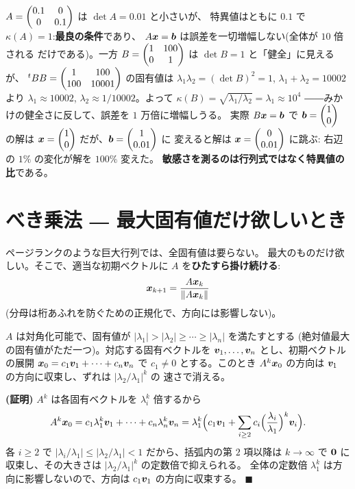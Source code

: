 \begin{hanrei}[行列式は敏感さの指標にならない]\label{hanrei:num-det}
$A = \begin{pmatrix}0.1 & 0 \\ 0 & 0.1\end{pmatrix}$ は $\det A = 0.01$ と小さいが、
特異値はともに $0.1$ で $\kappa(A) = 1$:\textbf{最良の条件}であり、
$A\bm{x} = \bm{b}$ は誤差を一切増幅しない(全体が $10$ 倍される
だけである)。一方
$B = \begin{pmatrix}1 & 100 \\ 0 & 1\end{pmatrix}$ は $\det B = 1$ と「健全」に見えるが、
${}^tBB = \begin{pmatrix}1 & 100 \\ 100 & 10001\end{pmatrix}$ の固有値は
$\lambda_1\lambda_2 = (\det B)^2 = 1$, $\lambda_1 + \lambda_2 = 10002$
より $\lambda_1 \approx 10002$, $\lambda_2 \approx 1/10002$。よって
$\kappa(B) = \sqrt{\lambda_1/\lambda_2} = \lambda_1 \approx 10^4$
――みかけの健全さに反して、誤差を $1$ 万倍に増幅しうる。
実際 $B\bm{x} = \bm{b}$ で $\bm{b} = \begin{pmatrix}1 \\ 0\end{pmatrix}$ の解は
$\bm{x} = \begin{pmatrix}1 \\ 0\end{pmatrix}$ だが、$\bm{b} = \begin{pmatrix}1 \\ 0.01\end{pmatrix}$ に
変えると解は $\bm{x} = \begin{pmatrix}0 \\ 0.01\end{pmatrix}$ に跳ぶ:
右辺の $1\%$ の変化が解を $100\%$ 変えた。
\textbf{敏感さを測るのは行列式ではなく特異値の比}である。
\end{hanrei}

\section{べき乗法 ― 最大固有値だけ欲しいとき}

ページランクのような巨大行列では、全固有値は要らない。
最大のものだけ欲しい。そこで、適当な初期ベクトルに
$A$ を\textbf{ひたすら掛け続ける}:
\[
\bm{x}_{k+1} = \frac{A\bm{x}_k}{\|A\bm{x}_k\|}
\]
(分母は桁あふれを防ぐための正規化で、方向には影響しない)。

\begin{teiri}[べき乗法の収束]\label{thm:num-power}
$A$ は対角化可能で、固有値が
$|\lambda_1| > |\lambda_2| \ge \cdots \ge |\lambda_n|$ を満たすとする
(絶対値最大の固有値がただ一つ)。対応する固有ベクトルを
$\bm{v}_1, \dots, \bm{v}_n$ とし、初期ベクトルの展開
$\bm{x}_0 = c_1\bm{v}_1 + \cdots + c_n\bm{v}_n$ で
$c_1 \neq 0$ とする。このとき $A^k\bm{x}_0$ の方向は
$\bm{v}_1$ の方向に収束し、ずれは $|\lambda_2/\lambda_1|^k$ の
速さで消える。
\end{teiri}

\noindent\textbf{(証明)}\quad
$A^k$ は各固有ベクトルを $\lambda_i^k$ 倍するから
\[
A^k\bm{x}_0 = c_1\lambda_1^k\bm{v}_1 + \cdots
+ c_n\lambda_n^k\bm{v}_n
= \lambda_1^k \Bigl( c_1\bm{v}_1
+ \sum_{i \ge 2} c_i \Bigl(\frac{\lambda_i}{\lambda_1}\Bigr)^{k}
\bm{v}_i \Bigr).
\]
各 $i \ge 2$ で $|\lambda_i/\lambda_1| \le |\lambda_2/\lambda_1| < 1$
だから、括弧内の第 $2$ 項以降は $k \to \infty$ で $\bm{0}$ に
収束し、その大きさは $|\lambda_2/\lambda_1|^k$ の定数倍で抑えられる。
全体の定数倍 $\lambda_1^k$ は方向に影響しないので、方向は
$c_1\bm{v}_1$ の方向に収束する。 $\blacksquare$

